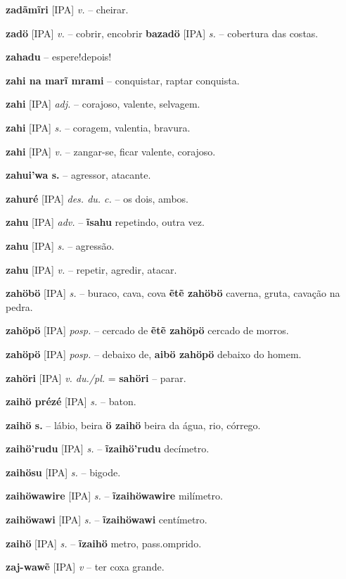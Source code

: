 \textbf{zadãmĩri} [IPA] \textit{v.} -- cheirar.

\textbf{zadö} [IPA] \textit{v.} -- cobrir, encobrir  \textbf{bazadö} [IPA] \textit{s.} -- cobertura das costas.

\textbf{zahadu} -- espere!depois!

\textbf{zahi na marĩ mrami} -- conquistar, raptar  conquista.

\textbf{zahi} [IPA] \textit{adj.} -- corajoso, valente, selvagem.

\textbf{zahi} [IPA] \textit{s.} -- coragem, valentia, bravura.

\textbf{zahi} [IPA] \textit{v.} -- zangar-se, ficar valente, corajoso.

\textbf{zahui'wa s.} -- agressor, atacante.

\textbf{zahuré} [IPA] \textit{des. du. c.} -- os dois, ambos.

\textbf{zahu} [IPA] \textit{adv.} -- \textbf{ĩsahu} repetindo, outra vez.

\textbf{zahu} [IPA] \textit{s.} -- agressão.

\textbf{zahu} [IPA] \textit{v.} -- repetir, agredir, atacar.

\textbf{zahöbö} [IPA] \textit{s.} -- buraco, cava, cova  \textbf{ẽtẽ zahöbö} caverna, gruta, cavação na pedra.

\textbf{zahöpö} [IPA] \textit{posp.} -- cercado de  \textbf{ẽtẽ zahöpö} cercado de morros.

\textbf{zahöpö} [IPA] \textit{posp.} -- debaixo de, \textbf{aibö zahöpö} debaixo do homem.

\textbf{zahöri} [IPA] \textit{v. du./pl.} = \textbf{sahöri} -- parar.

\textbf{zaihö prézé} [IPA] \textit{s.} -- baton.

\textbf{zaihö s.} -- lábio, beira  \textbf{ö zaihö} beira da água, rio, córrego.

\textbf{zaihö'rudu} [IPA] \textit{s.} -- \textbf{ĩzaihö'rudu} decímetro.

\textbf{zaihösu} [IPA] \textit{s.} -- bigode.

\textbf{zaihöwawire} [IPA] \textit{s.} -- \textbf{ĩzaihöwawire} milímetro.

\textbf{zaihöwawi} [IPA] \textit{s.} -- \textbf{ĩzaihöwawi} centímetro.

\textbf{zaihö} [IPA] \textit{s.} -- \textbf{ĩzaihö} metro, pass.omprido.

\textbf{zaj-wawẽ} [IPA] \textit{v} -- {ter coxa grande}.

